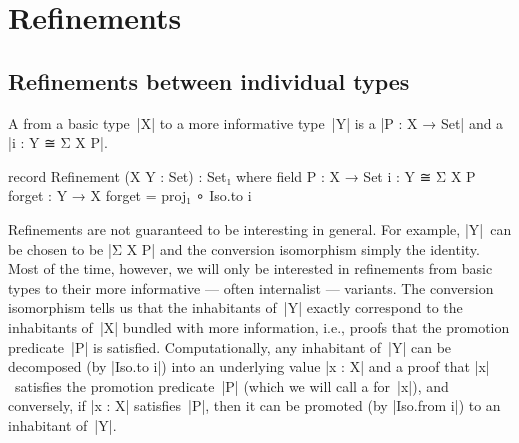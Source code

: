 \section{Refinements}
\label{sec:refinements}

\subsection{Refinements between individual types}
\label{sec:individual-refinements}

A  from a basic type~|X| to a more informative type~|Y| is a  |P : X → Set| and a  |i : Y ≅ Σ X P|.
\begin{code}
record Refinement (X Y : Set) : Set₁ where
  field
    P  :  X → Set
    i  :  Y ≅ Σ X P
  forget : Y → X
  forget = proj₁ ∘ Iso.to i
\end{code}
Refinements are not guaranteed to be interesting in general.
For example, |Y|~can be chosen to be |Σ X P| and the conversion isomorphism simply the identity.
Most of the time, however, we will only be interested in refinements from basic types to their more informative --- often internalist --- variants.
The conversion isomorphism tells us that the inhabitants of~|Y| exactly correspond to the inhabitants of~|X| bundled with more information, i.e., proofs that the promotion predicate~|P| is satisfied.
Computationally, any inhabitant of~|Y| can be decomposed (by |Iso.to i|\kern1pt) into an underlying value |x : X| and a proof that |x|~satisfies the promotion predicate~|P| (which we will call a  for~|x|), and conversely, if |x : X| satisfies~|P|, then it can be promoted (by |Iso.from i|\kern1pt) to an inhabitant of~|Y|.


